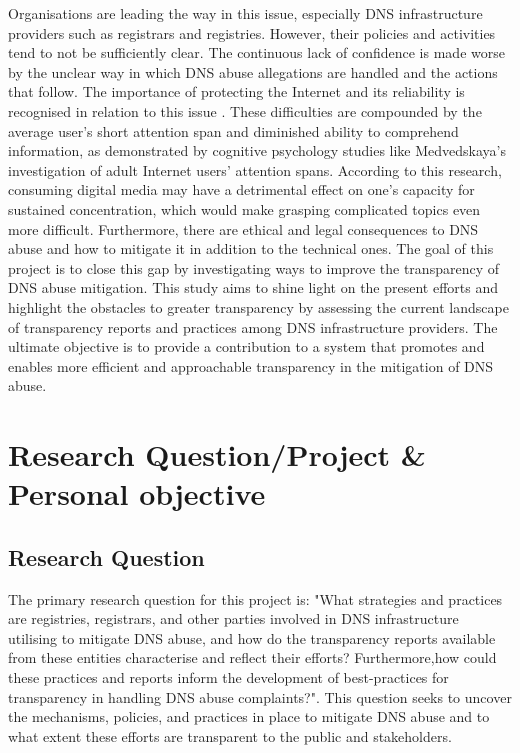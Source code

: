 Organisations are leading the way in this issue, especially DNS infrastructure providers such as registrars and registries. However, their policies and activities tend to not be sufficiently clear. The continuous lack of confidence is made worse by the unclear way in which DNS abuse allegations are handled and the actions that follow. The importance of protecting the Internet and its reliability is recognised in relation to this issue \cite{cerf2022}. These difficulties are compounded by the average user's short attention span and diminished ability to comprehend information, as demonstrated by cognitive psychology studies like Medvedskaya's \cite{medvedskaya2022} investigation of adult Internet users' attention spans. According to this research, consuming digital media may have a detrimental effect on one's capacity for sustained concentration, which would make grasping complicated topics even more difficult. Furthermore, there are ethical and legal consequences to DNS abuse and how to mitigate it in addition to the technical ones. The goal of this project is to close this gap by investigating ways to improve the transparency of DNS abuse mitigation. This study aims to shine light on the present efforts and highlight the obstacles to greater transparency by assessing the current landscape of transparency reports and practices among DNS infrastructure providers. The ultimate objective is to provide a contribution to a system that promotes and enables more efficient and approachable transparency in the mitigation of DNS abuse.


\section{Research Question/Project \& Personal objective} 
\subsection{Research Question}

The primary research question for this project is: "What strategies and practices are registries, registrars, and other parties involved in DNS infrastructure utilising to mitigate DNS abuse, and how do the transparency reports available from these entities characterise and reflect their efforts? Furthermore,how could these practices and reports inform the development of best-practices for transparency in handling DNS abuse complaints?". This question seeks to uncover the mechanisms, policies, and practices in place to mitigate DNS abuse and to what extent these efforts are transparent to the public and stakeholders.

